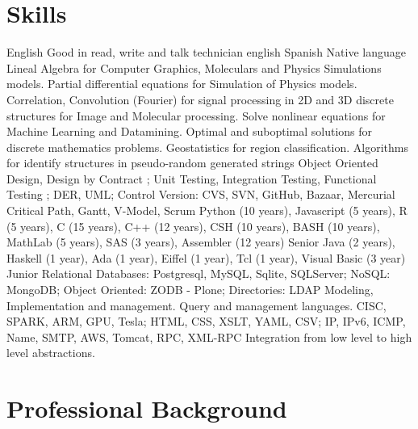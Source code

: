 \section{Skills}
        {English}
        {Good in read, write and talk technician english}
        {}
        {}
        {}
\cventry{}
        {Spanish}
        {Native language}
        {}
        {}
        {}
	{Lineal Algebra for Computer Graphics, Moleculars and Physics Simulations models. Partial differential equations for Simulation of Physics models. Correlation, Convolution (Fourier) for signal processing in 2D and 3D discrete structures for Image and Molecular processing. Solve nonlinear equations for Machine Learning and Datamining. Optimal and suboptimal solutions for discrete mathematics problems. Geostatistics for region classification. Algorithms for identify structures in pseudo-random generated strings}
	{}
	{}
	{}
	{}
        {Object Oriented Design, Design by Contract ; Unit Testing, Integration Testing, Functional Testing ; DER, UML; Control Version: CVS, SVN, GitHub, Bazaar, Mercurial}
        {}
        {}
        {}
        {}
        {Critical Path, Gantt, V-Model, Scrum}
        {}
        {}
        {}
        {}
        {Python (10 years), Javascript (5 years), R (5 years), C (15 years), C++ (12 years), CSH (10 years), BASH (10 years), MathLab (5 years), SAS (3 years), Assembler (12 years)}
        {Senior}
        {}
        {}
        {}
\cventry{}
        {Java (2 years), Haskell (1 year), Ada (1 year), Eiffel (1 year), Tcl (1 year), Visual Basic (3 year)}
        {Junior}
        {}
        {}
        {}
        {Relational Databases: Postgresql, MySQL, Sqlite, SQLServer; NoSQL: MongoDB; Object Oriented: ZODB - Plone; Directories: LDAP}
        {Modeling, Implementation and management. Query and management languages.}
        {}
        {}
        {}
        {CISC, SPARK, ARM, GPU, Tesla; HTML, CSS, XSLT, YAML, CSV; IP, IPv6, ICMP, Name, SMTP, AWS, Tomcat, RPC, XML-RPC}
        {Integration from low level to high level abstractions.}
        {}
        {}
        {}

\section{Professional Background}\label{profesional:desde}

